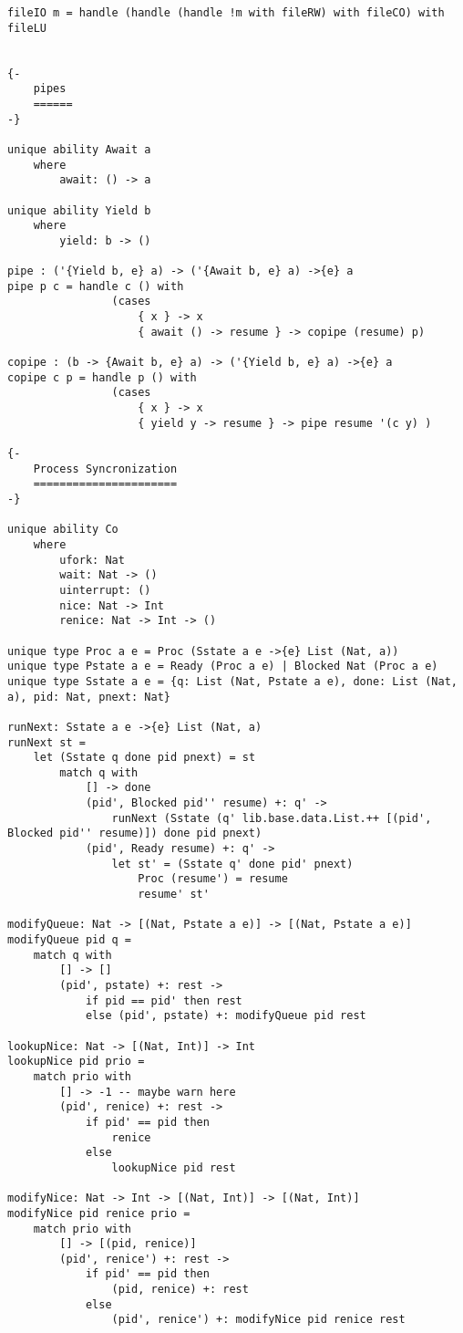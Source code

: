 \documentclass[logo,bsc,singlespacing,parskip]{infthesis}
\begin{document}
\begin{lstlisting}[language=unison]
fileIO m = handle (handle (handle !m with fileRW) with fileCO) with fileLU


{-
    pipes
    ======
-}

unique ability Await a
    where
        await: () -> a

unique ability Yield b
    where
        yield: b -> ()

pipe : ('{Yield b, e} a) -> ('{Await b, e} a) ->{e} a
pipe p c = handle c () with
                (cases
                    { x } -> x
                    { await () -> resume } -> copipe (resume) p)

copipe : (b -> {Await b, e} a) -> ('{Yield b, e} a) ->{e} a
copipe c p = handle p () with
                (cases
                    { x } -> x
                    { yield y -> resume } -> pipe resume '(c y) )

{-
    Process Syncronization
    ======================
-}

unique ability Co 
    where 
        ufork: Nat
        wait: Nat -> ()
        uinterrupt: ()
        nice: Nat -> Int
        renice: Nat -> Int -> ()

unique type Proc a e = Proc (Sstate a e ->{e} List (Nat, a))
unique type Pstate a e = Ready (Proc a e) | Blocked Nat (Proc a e)
unique type Sstate a e = {q: List (Nat, Pstate a e), done: List (Nat, a), pid: Nat, pnext: Nat}

runNext: Sstate a e ->{e} List (Nat, a)
runNext st =
    let (Sstate q done pid pnext) = st
        match q with
            [] -> done
            (pid', Blocked pid'' resume) +: q' -> 
                runNext (Sstate (q' lib.base.data.List.++ [(pid', Blocked pid'' resume)]) done pid pnext)
            (pid', Ready resume) +: q' -> 
                let st' = (Sstate q' done pid' pnext)
                    Proc (resume') = resume
                    resume' st'

modifyQueue: Nat -> [(Nat, Pstate a e)] -> [(Nat, Pstate a e)]
modifyQueue pid q =
    match q with
        [] -> []
        (pid', pstate) +: rest ->
            if pid == pid' then rest
            else (pid', pstate) +: modifyQueue pid rest

lookupNice: Nat -> [(Nat, Int)] -> Int
lookupNice pid prio =
    match prio with 
        [] -> -1 -- maybe warn here
        (pid', renice) +: rest ->
            if pid' == pid then
                renice 
            else 
                lookupNice pid rest 

modifyNice: Nat -> Int -> [(Nat, Int)] -> [(Nat, Int)]
modifyNice pid renice prio =
    match prio with
        [] -> [(pid, renice)]
        (pid', renice') +: rest ->
            if pid' == pid then
                (pid, renice) +: rest
            else 
                (pid', renice') +: modifyNice pid renice rest


\end{lstlisting}
\end{document}
